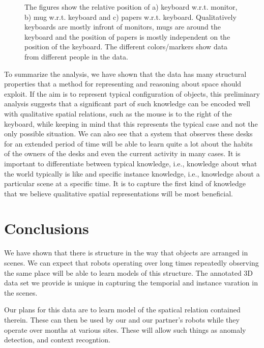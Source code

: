 \documentclass[letterpaper, 10 pt, conference]{ieeeconf}  %
\begin{document}
\begin{figure}
\begin{center}
\end{center}
\caption{The figures show the relative position of a) keyboard w.r.t. monitor, b) mug w.r.t. keyboard and c) papers w.r.t. keyboard. Qualitatively keyboards are mostly infront of monitors, mugs are around the keyboard and the position of papers is mostly independent on the position of the keyboard. The different colors/markers show data from different people in the data.} 
\label{fig:scatter-rest}
\end{figure}

To summarize the analysis, we have shown that the data has many structural properties that a method for representing and reasoning about 
space should exploit. If the aim is to represent typical configuration of objects, this preliminary analysis suggests that a significant 
part of such knowledge can be encoded well with qualitative spatial relations, such as the mouse is to the right of the keyboard, while 
keeping in mind that this represents the typical case and not the only possible situation. We can also see that a system that observes these desks for 
an extended period of time will be able to learn quite a lot about the habits of the owners of the desks and even the current activity in 
many cases. It is important to differentiate between typical knowledge, i.e., knowledge about what the world typically is like and specific 
instance knowledge, i.e., knowledge about a particular scene at a specific time. It is to capture the first kind of knowledge that we 
believe  qualitative spatial representations will be most beneficial. 

\section{Conclusions}
\label{sec:Conclusions}

We have shown that there is structure in the way that objects are
arranged in scenes.  We can expect that robots operating over long
times repeatedly observing the same place will be able to learn models
of this structure.  The annotated 3D data set we provide is unique in
capturing the temporial and instance varation in the scenes.

Our plans for this data are to learn model of the spatical relation
contained therein.  These can then be used by our and our partner's
robots while they operate over months at various sites.  These will
allow such things as anomaly detection, and context recogntion.
\end{document}
